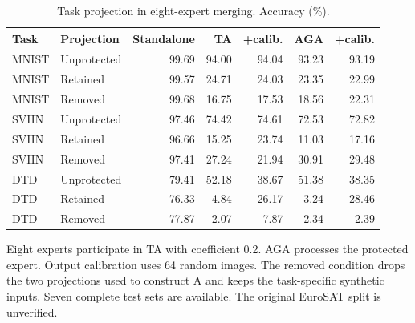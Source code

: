 \begin{table}[t]
\centering\small
\setlength{\tabcolsep}{4pt}
\caption{Task projection in eight-expert merging. Accuracy (\%).}
\label{tab:defense2_projection_eight}
\begin{tabular}{@{}llrrrrr@{}}
\toprule
Task & Projection & Standalone & TA & +calib. & AGA & +calib. \\
\midrule
MNIST & Unprotected & 99.69 & 94.00 & 94.04 & 93.23 & 93.19 \\
MNIST & Retained & 99.57 & 24.71 & 24.03 & 23.35 & 22.99 \\
MNIST & Removed & 99.68 & 16.75 & 17.53 & 18.56 & 22.31 \\
\midrule
SVHN & Unprotected & 97.46 & 74.42 & 74.61 & 72.53 & 72.82 \\
SVHN & Retained & 96.66 & 15.25 & 23.74 & 11.03 & 17.16 \\
SVHN & Removed & 97.41 & 27.24 & 21.94 & 30.91 & 29.48 \\
\midrule
DTD & Unprotected & 79.41 & 52.18 & 38.67 & 51.38 & 38.35 \\
DTD & Retained & 76.33 & 4.84 & 26.17 & 3.24 & 28.46 \\
DTD & Removed & 77.87 & 2.07 & 7.87 & 2.34 & 2.39 \\
\bottomrule
\end{tabular}
\par\smallskip
\begin{minipage}{\textwidth}\footnotesize Eight experts participate in TA with coefficient 0.2. AGA processes the protected expert. Output calibration uses 64 random images. The removed condition drops the two projections used to construct A and keeps the task-specific synthetic inputs. Seven complete test sets are available. The original EuroSAT split is unverified.\end{minipage}
\end{table}
